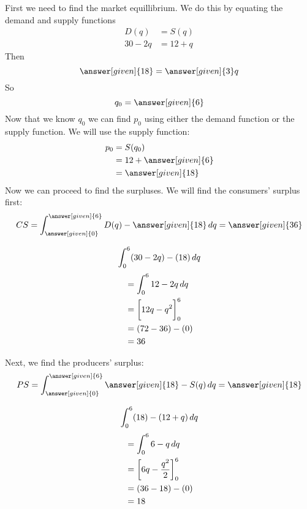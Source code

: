 \documentclass{ximera}
\begin{document}
\begin{example}
\begin{explanation}
First we need to find the market equillibrium. We do this by equating the demand and supply functions
\begin{align*}
  D(q) &= S(q) \\
  30-2q &= 12+q 
\end{align*} 
Then 
$$\answer[given]{18} = \answer[given]{3}q$$
So
$$q_{0}=\answer[given]{6}$$
Now that we know $q_{0}$ we can find $p_{0}$ using either the demand function or the supply function. We will
use the supply function:
\begin{align*}
  p_{0} &= S(q_{0}) \\
   	   &= 12+\answer[given]{6} \\
	   &= \answer[given]{18}
\end{align*}
Now we can proceed to find the surpluses. We will find the consumers' surplus first:
\[ 
CS = \int_{\answer[given]{0}}^{\answer[given]{6}} D(q) - \answer[given]{18} \d q = \answer[given]{36}
\]
\begin{hint}
\[
\int_0^6 (30-2q)-(18) \mathop{}\!d q
\]
\begin{align*}
  &=\int_0^6 12-2q \mathop{}\!d q \\
  &=\bigg[ 12q-q^2 \bigg]_0^6 \\
  &= (72-36)-(0) \\
  &=36
\end{align*}
\end{hint}
Next, we find the producers' surplus:
\[ 
PS = \int_{\answer[given]{0}}^{\answer[given]{6}}  \answer[given]{18}-S(q) \d q = \answer[given]{18}
\]
\begin{hint}
\[
\int_0^6 (18)-(12+q) \mathop{}\!d q
\]
\begin{align*}
  &=\int_0^6 6-q \mathop{}\!d q \\
  &=\bigg[ 6q-\frac{q^2}{2} \bigg]_0^6 \\
  &= (36-18)-(0) \\
  &=18
\end{align*}
\end{hint}
\end{explanation}
\end{example}
\end{document}
